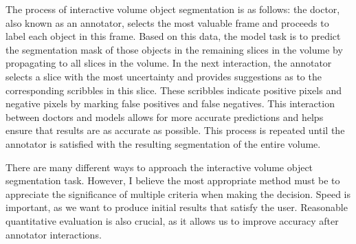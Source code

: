 The process of interactive volume object segmentation is as follows: the doctor, also known as an annotator, selects the most valuable frame and proceeds to label each object in this frame. Based on this data, the model task is to predict the segmentation mask of those objects in the remaining slices in the volume by propagating to all slices in the volume. In the next interaction, the annotator selects a slice with the most uncertainty and provides suggestions as to the corresponding scribbles in this slice. These scribbles indicate positive pixels and negative pixels by marking false positives and false negatives. This interaction between doctors and models allows for more accurate predictions and helps ensure that results are as accurate as possible. This process is repeated until the annotator is satisfied with the resulting segmentation of the entire volume.

There are many different ways to approach the interactive volume object segmentation task. However, I believe the most appropriate method must be to appreciate the significance of multiple criteria when making the decision. Speed is important, as we want to produce initial results that satisfy the user. Reasonable quantitative evaluation is also crucial, as it allows us to improve accuracy after annotator interactions.
